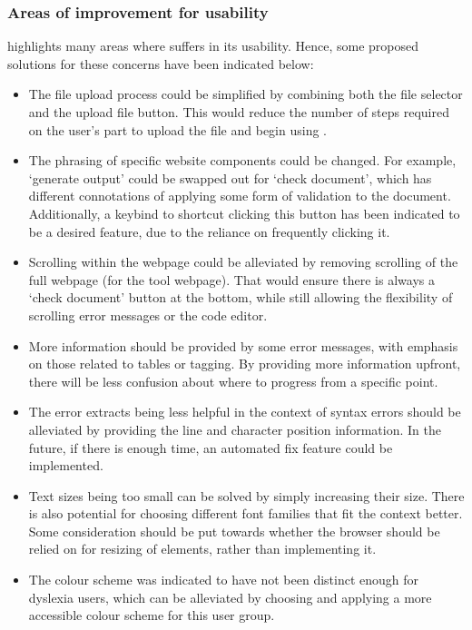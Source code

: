 \subsubsection{\nmu Areas \nmu of improvement for \lintexspaced usability}\label{user_study:lintex_accessible}
 highlights many areas where \lintexspaced suffers in its usability. Hence, some proposed solutions for these concerns have been indicated below:
\begin{itemize}
    \item The file upload process could be simplified by combining both the file selector and the upload file button. This would reduce the number of steps required on the user's part to upload the file and begin using \lintex.
    \item The phrasing of specific website components could be changed. For example, `generate output' could be swapped out for `check document', which has different connotations of applying some form of validation to the document. Additionally, a keybind to shortcut clicking this button has been indicated to be a desired feature, due to the reliance on frequently clicking it.
    \item Scrolling within the webpage could be alleviated by removing scrolling of the full webpage (for the tool webpage). That would ensure there is always a `check document' button at the bottom, while still allowing the flexibility of scrolling error messages or the code editor.
    \item More information should be provided by some error messages, with emphasis on those related to tables or tagging. By providing more information upfront, there will be less confusion about where to progress from a specific point.
    \item The error extracts being less helpful in the context of syntax errors should be alleviated by providing the line and character position information. In the future, if there is enough time, an automated fix feature could be implemented.
    \item Text sizes being too small can be solved by simply increasing their size. There is also potential for choosing different font families that fit the context better. Some consideration should be put towards whether the browser should be relied on for resizing of elements, rather than \lintexspaced implementing it.
    \item The colour scheme was indicated to have not been distinct enough for dyslexia users, which can be alleviated by choosing and applying a more accessible colour scheme for this user group.
\end{itemize}

